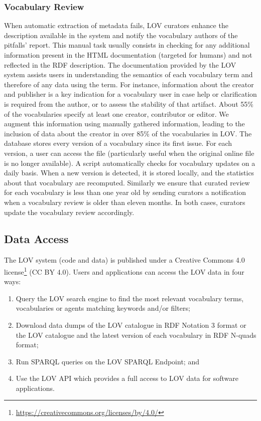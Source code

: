 \documentclass{iosart2c}
\begin{document}
	\subsubsection{Vocabulary Review}
When automatic extraction of metadata fails, LOV curators enhance the description available in the system and notify the vocabulary authors of the pitfalls' report. This manual task usually consists in checking for any additional information present in the HTML documentation (targeted for humans) and not reflected in the RDF description. The documentation provided by the LOV system assists users in understanding the semantics of each vocabulary term and therefore of any data using the term. For instance, information about the creator and publisher is a key indication for a vocabulary user in case help or clarification is required from the author, or to assess the stability of that artifact. About 55\% of the vocabularies specify at least one creator, contributor or editor. We augment this information using manually gathered information, leading to the inclusion of data about the creator in over 85\% of the vocabularies in LOV. The database stores every version of a vocabulary since its first issue. For each version, a user can access the file (particularly useful when the original online file is no longer available). A script automatically checks for vocabulary updates on a daily basis. When a new version is detected, it is stored locally, and the statistics about that vocabulary are recomputed. Similarly we ensure that curated review for each vocabulary is less than one year old by sending curators a notification when a vocabulary review is older than eleven months. In both cases, curators update the vocabulary review accordingly. 



\subsection{Data Access}

The LOV system (code and data) is published under a Creative Commons 4.0 license\footnote{\url{https://creativecommons.org/licenses/by/4.0/}} (CC BY 4.0). Users and applications can access the LOV data in four ways:
		\begin{enumerate} 
			\item Query the LOV search engine to find the most relevant vocabulary terms, vocabularies or agents matching keywords and/or filters;
			\item Download data dumps of the LOV catalogue in RDF Notation 3 format or the LOV catalogue and the latest version of each vocabulary in RDF N-quads format;
			\item Run SPARQL queries on the LOV SPARQL Endpoint; and
			\item Use the LOV API which provides a full access to LOV data for software applications.
		\end{enumerate}
		
\end{document}
